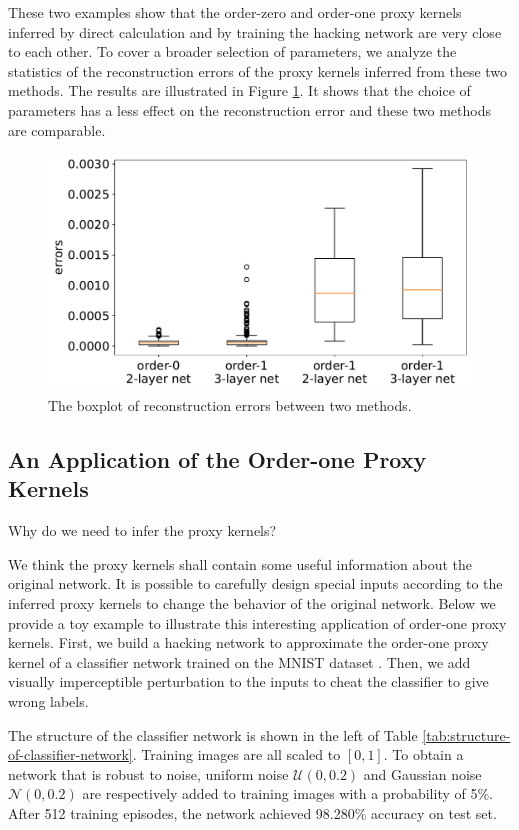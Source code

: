\documentclass[twoside,11pt]{article}
\newcommand{\syncrecord}[2]{#2} %
\begin{document}
These two examples show that the order-zero and order-one proxy kernels inferred by direct calculation and by training the hacking network are very close to each other.
To cover a broader selection of parameters, we analyze the statistics of the reconstruction errors of the proxy kernels inferred from these two methods. The results are illustrated in Figure \ref{fig:oconv-conv-approximate-err-histogram}.
It shows that the choice of parameters has a less effect on the reconstruction error and these two methods are comparable.

\begin{figure}[htbp]
  \centering
  \includegraphics[width=0.6\linewidth]{img/oconv-conv-approximate-err-histogram.pdf}
  \caption{The boxplot of reconstruction errors between two methods.}
  \label{fig:oconv-conv-approximate-err-histogram}
\end{figure}

\subsection{An Application of the Order-one Proxy Kernels}
\label{subsec:hacking-network}

Why do we need to infer the proxy kernels?

We think the proxy kernels shall contain some useful information about the original network.
It is possible to carefully design special inputs according to the inferred proxy kernels to change the behavior of the original network.
Below we provide a toy example to illustrate this interesting application of order-one proxy kernels.
First, we build a hacking network to approximate the order-one proxy kernel of a classifier network trained on the MNIST dataset \citep{LeCun1998}. Then, we add visually imperceptible perturbation to the inputs to cheat the classifier to give wrong labels.

The structure of the classifier network is shown in the left of Table \ref{tab:structure-of-classifier-network}. Training images are all scaled to \([0,1]\). To obtain a network that is robust to noise, uniform noise \(\mathcal{U}(0,0.2)\) and Gaussian noise \(\mathcal{N}(0, 0.2)\) are respectively added to training images with a probability of 5\%.
After 512 training episodes, the network achieved \syncrecord{mnist_classifier_accuracy}{98.280\%} accuracy on test set.
\end{document}
